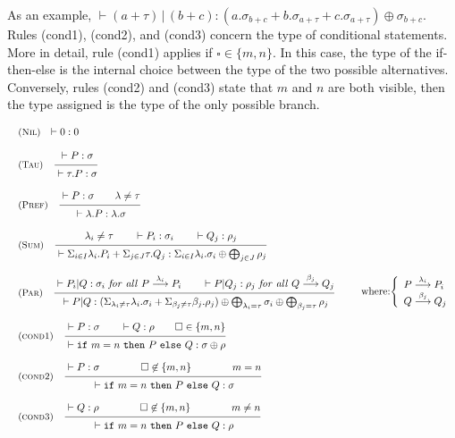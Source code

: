\documentclass[submission,copyright,creativecommons]{eptcs}
\makeatletter
\newcommand{\opaque}{\square}
\newcommand{\mathaxiom}[2]{
     \begin{array}{l@{\quad}l}{\mbox{\small ({\sc #1})} }
      &{#2}\end{array}}
\def \mathrule #1#2#3{\begin{array}{l@{\quad}l}{\mbox{\small ({\sc #1})} }& \irule{#2}{#3}\end{array}}
\newcommand{\irule}[2]{\frac{\textstyle\rule[-1.3ex]{0cm}{3ex}#1}{\textstyle\rule[-.5ex]{0cm}{3ex}#2}}
\newcommand{\ifte}[3]{{\tt if}\ #1\ {\tt then }\ #2\ {\tt else }\ #3}
\newcommand{\act}{\lambda}
\newcommand{\ltr}[1]{\stackrel{#1}{\longrightarrow}}
\makeatother
\begin{document}
As an example, $\vdash (a + \tau) \, | \, (b + c) : (a.\sigma_{b+c} + b.\sigma_{a + \tau} + c.\sigma_{a + \tau}) \oplus \sigma_{b+c}$. 
Rules ({\sc cond1}), ({\sc cond2}), and ({\sc cond3}) concern the type of conditional statements. 
More in detail, rule ({\sc cond1}) applies if $\opaque\in\{m, n \}$. In this case, the type of the if-then-else is the internal choice between the type of the two possible alternatives. Conversely, rules ({\sc cond2}) and ({\sc cond3}) state that $m$ and $n$ are both visible, then the type assigned is the type of the only possible branch.

\begin{table}[t]
\begin{math}
\begin{array}{l}
 \mathaxiom{Nil}{\vdash {0}: 0}\\
  \\
  \mathrule{Tau}
  {\vdash P : \sigma}
  {\vdash \tau.P : \sigma}\\
  \\
  \mathrule{Pref}
  {\vdash P : \sigma \qquad \act \neq \tau}
  {\vdash \act.P : \act.\sigma}\\
  \\
  \mathrule{Sum}
  {\act_i \neq\tau \qquad \vdash P_i:\sigma_i \qquad \vdash Q_j:\rho_j}
  {\vdash \Sigma_{i\in I} \act_i.P_i + \Sigma_{j \in J} \tau.Q_j: \Sigma_{i \in I} \act_i.\sigma_i \oplus 
   \bigoplus_{j\in J} \rho_j}\\ 
  \\
  \mathrule{Par}
  {\vdash P_i | Q:\sigma_i\ {\it for\  all\ } P \ltr{\act_i} P_i   \qquad \vdash P | Q_j:\rho_j\     
  {\it for\  all\ }  Q \ltr{\beta_j} Q_j}
  {\vdash P | Q : (\Sigma_{\act_i \neq \tau} \act_i.\sigma_i + \Sigma_{\beta_j \neq\tau} 
   \beta_j.\rho_j)
   \oplus  \bigoplus_{\act_i = \tau} \sigma_i \oplus \bigoplus_{\beta_j = \tau} \rho_j }
  \qquad
  {\mbox{where:}\Bigg\{ 
    \begin{array}{l}
      P \ltr{\act_i} P_i\\
      Q \ltr{\beta_j} Q_j
    \end{array}}\\
   \\ 
   \mathrule{cond1}
  {\vdash P : \sigma \qquad \vdash Q : \rho \qquad \opaque\in\{m,n\}}
  {\vdash\ifte{m=n}PQ : \sigma \oplus \rho}\\
  \\
  \mathrule{cond2}
  {\vdash P : \sigma \qquad \qquad \opaque\not\in\{m,n\} \qquad \qquad m = n}
  {\vdash\ifte{m=n}PQ : \sigma}\\
  \\
  \mathrule{cond3}
  {\vdash Q : \rho \qquad \qquad \opaque\not\in\{m,n\} \qquad \qquad m \neq n}
  {\vdash\ifte{m=n}PQ : \rho}\\
  \\  
 \end{array}
\end{math}
\caption{Type System for Contracts}
\label{table:type_system}
\end{table}
\end{document}
